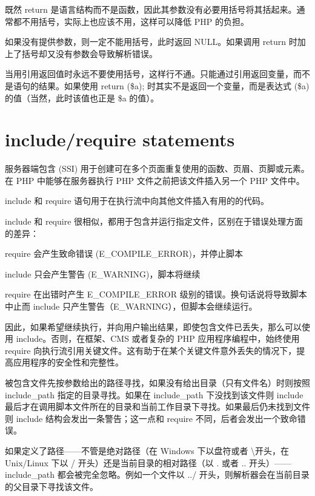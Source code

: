 既然 return 是语言结构而不是函数，因此其参数没有必要用括号将其括起来。通常都不用括号，实际上也应该不用，这样可以降低 PHP 的负担。

如果没有提供参数，则一定不能用括号，此时返回 NULL。如果调用 return 时加上了括号却又没有参数会导致解析错误。

当用引用返回值时永远不要使用括号，这样行不通。只能通过引用返回变量，而不是语句的结果。如果使用 return (\$a); 时其实不是返回一个变量，而是表达式 (\$a) 的值（当然，此时该值也正是 \$a 的值）。



\section{include/require statements}

服务器端包含 (SSI) 用于创建可在多个页面重复使用的函数、页眉、页脚或元素。在 PHP 中能够在服务器执行 PHP 文件之前把该文件插入另一个 PHP 文件中。

include 和 require 语句用于在执行流中向其他文件插入有用的的代码。

include 和 require 很相似，都用于包含并运行指定文件，区别在于错误处理方面的差异：

\begin{compactitem}
\item require 会产生致命错误 (E\_COMPILE\_ERROR)，并停止脚本
\item include 只会产生警告 (E\_WARNING)，脚本将继续
\end{compactitem}

require 在出错时产生 E\_COMPILE\_ERROR 级别的错误。换句话说将导致脚本中止而 include 只产生警告（E\_WARNING），但脚本会继续运行。

因此，如果希望继续执行，并向用户输出结果，即使包含文件已丢失，那么可以使用 include。否则，在框架、CMS 或者复杂的 PHP 应用程序编程中，始终使用 require 向执行流引用关键文件。这有助于在某个关键文件意外丢失的情况下，提高应用程序的安全性和完整性。

被包含文件先按参数给出的路径寻找，如果没有给出目录（只有文件名）时则按照 include\_path 指定的目录寻找。如果在 include\_path 下没找到该文件则 include 最后才在调用脚本文件所在的目录和当前工作目录下寻找。如果最后仍未找到文件则 include 结构会发出一条警告；这一点和 require 不同，后者会发出一个致命错误。

如果定义了路径——不管是绝对路径（在 Windows 下以盘符或者 \textbackslash 开头，在 Unix/Linux 下以 / 开头）还是当前目录的相对路径（以 . 或者 .. 开头）——include\_path 都会被完全忽略。例如一个文件以 ../ 开头，则解析器会在当前目录的父目录下寻找该文件。


